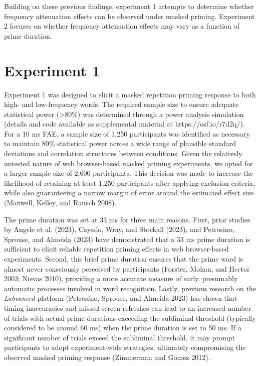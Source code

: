 \documentclass[
]{interact}
\begin{document}
Building on these previous findings, experiment 1 attempts to determine
whether frequency attenuation effects can be observed under masked
priming. Experiment 2 focuses on whether frequency attenuation effects
may vary as a function of prime duration.

\section{Experiment 1}\label{sec-exp1}

Experiment 1 was designed to elicit a masked repetition priming response
to both high- and low-frequency words. The required sample size to
ensure adequate statistical power (\textgreater80\%) was determined
through a power analysis simulation (details and code available as
supplemental material at https://osf.io/r7d2q/). For a 10 ms FAE, a
sample size of 1,250 participants was identified as necessary to
maintain 80\% statistical power across a wide range of plausible
standard deviations and correlation structures between conditions. Given
the relatively untested nature of web browser-based masked priming
experiments, we opted for a larger sample size of 2,600 participants.
This decision was made to increase the likelihood of retaining at least
1,250 participants after applying exclusion criteria, while also
guaranteeing a narrow margin of error around the estimated effect size
(Maxwell, Kelley, and Rausch 2008).

The prime duration was set at 33 ms for three main reasons. First, prior
studies by Angele et al. (2023), Cayado, Wray, and Stockall (2023), and
Petrosino, Sprouse, and Almeida (2023) have demonstrated that a 33 ms
prime duration is sufficient to elicit reliable repetition priming
effects in web browser-based experiments. Second, this brief prime
duration ensures that the prime word is almost never consciously
perceived by participants (Forster, Mohan, and Hector 2003; Nievas
2010), providing a more accurate measure of early, presumably automatic
processes involved in word recognition. Lastly, previous research on the
\emph{Labvanced} platform (Petrosino, Sprouse, and Almeida 2023) has
shown that timing inaccuracies and missed screen refreshes can lead to
an increased number of trials with actual prime durations exceeding the
subliminal threshold (typically considered to be around 60 ms) when the
prime duration is set to 50 ms. If a significant number of trials exceed
the subliminal threshold, it may prompt participants to adopt
experiment-wide strategies, ultimately compromising the observed masked
priming response (Zimmerman and Gomez 2012).
\end{document}
